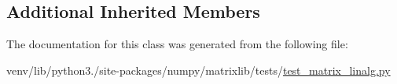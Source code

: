\subsection*{Additional Inherited Members}


The documentation for this class was generated from the following file\+:\begin{DoxyCompactItemize}
\item 
venv/lib/python3./site-\/packages/numpy/matrixlib/tests/\hyperlink{test__matrix__linalg_8py}{test\+\_\+matrix\+\_\+linalg.\+py}\end{DoxyCompactItemize}
